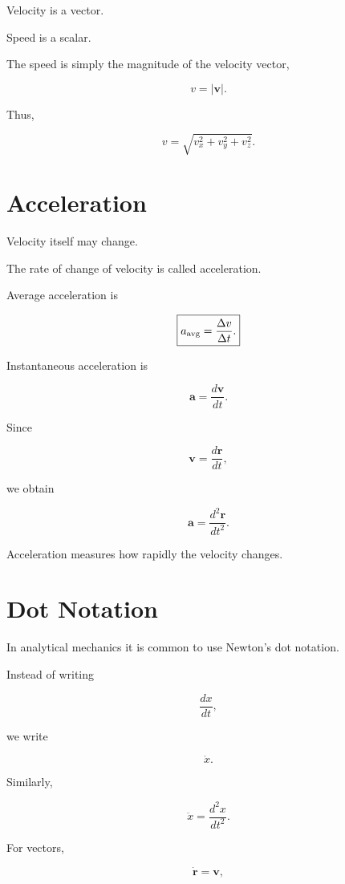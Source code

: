 \documentclass[11pt,a4paper,openany]{book}
\begin{document}
Velocity is a vector.

Speed is a scalar.

The speed is simply the magnitude of the velocity vector,

\[
\boxed{
	v
	=
	|\mathbf v|.
}
\]

Thus,

\[
v
=
\sqrt{
	v_x^2
	+
	v_y^2
	+
	v_z^2
}.
\]


\section{Acceleration}

Velocity itself may change.

The rate of change of velocity is called acceleration.

Average acceleration is

\[
\boxed{
	a_{\rm avg}
	=
	\frac{\Delta v}{\Delta t}.
}
\]

Instantaneous acceleration is

\[
\boxed{
	\mathbf a
	=
	\frac{d\mathbf v}{dt}.
}
\]

Since

\[
\mathbf v
=
\frac{d\mathbf r}{dt},
\]

we obtain

\[
\boxed{
	\mathbf a
	=
	\frac{d^2\mathbf r}{dt^2}.
}
\]

Acceleration measures how rapidly the velocity changes.


\section{Dot Notation}

In analytical mechanics it is common to use Newton's dot notation.

Instead of writing

\[
\frac{dx}{dt},
\]

we write

\[
\boxed{
	\dot x.
}
\]

Similarly,

\[
\boxed{
	\ddot x
	=
	\frac{d^2x}{dt^2}.
}
\]

For vectors,

\[
\boxed{
	\dot{\mathbf r}
	=
	\mathbf v,
}
\]
\end{document}
